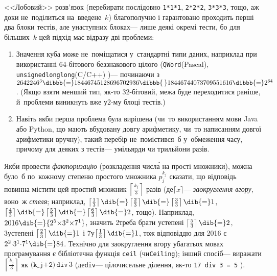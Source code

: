 \Tutorial
<<Лобовий>> розв'язок (перебирати послідовно \texttt{1*1*1}, \texttt{2*2*2}, \texttt{3*3*3}, тощо, аж доки не~поділиться на~введене~$k$) благополучно і гарантовано проходить перші два блоки тестів, але у\nolinebreak[3] наступних блоках\nolinebreak[3] --- лише деякі окремі тести, бо для більших~$k$ цей підхід має відразу дві проблеми: 
\begin{enumerate}
\item
Значення куба може не~поміщатися у~стандартні типи даних, наприклад при використанні \mbox{64-}\nolinebreak[3]бітового беззна\-ко\-вого цілого (\texttt{QWord}\nolinebreak[2] (Pascal), \texttt{unsigned\nolinebreak[2] long\nolinebreak[2] long}\nolinebreak[2] (C/C++)%
)\nolinebreak[3] --- починаючи з $2642246^3\dibbb{{=}}18446745128696702936\dibbb{{\>}}18446744073709551616\dibbb{{=}}2^{64}$.
(Якщо взяти менший тип, як-то \mbox{32-}\nolinebreak[3]бітовий, межа буде переходитися %
раніше, й~проблеми виникнуть вже у\nolinebreak[3] \mbox{2-му} блоці тестів.)
\item
Навіть якби перша проблема була вирішена (чи~то використанням мови Java або Python, що мають вбудовану довгу арифметику, чи~то написанням довгої арифметики вручну), такий перебір не~помістився~б у~обмеження часу, причому для деяких з тестів\nolinebreak[3] --- у\nolinebreak[3] мільярди чи трильйони разів.
\end{enumerate}


Якби провести \emph{факторизацію} (розкладення числ\'{а} на прості множники), можна було~б по~кожному степеню простого множника $p_j^{k_j}$ сказати, що відповідь повинна містити цей простий множник 
$\left\lceil\frac{k_j}{3}\right\rceil$ разів (де\nolinebreak[3] $\lceil{x}\rceil$\nolinebreak[3] --- \emph{заокруглення вгору}, воно~ж \emph{стеля}; наприклад, 
$\left\lceil\frac{1}{3}\right\rceil\dib{{=}}
 \left\lceil\frac{2}{3}\right\rceil\dib{{=}}
 \left\lceil\frac{3}{3}\right\rceil\dib{{=}}1$,
$\left\lceil\frac{4}{3}\right\rceil\dib{{=}}
 \left\lceil\frac{5}{3}\right\rceil\dib{{=}}
 \left\lceil\frac{6}{3}\right\rceil\dib{{=}}2$, тощо).
Наприклад, $2016\dib{{=}}{2^5{\times}3^2{\times}7^1}$, значить 
2\nolinebreak[3] треба брати у\nolinebreak[1] степені $\left\lceil\frac{5}{3}\right\rceil\dib{{=}}2$,
3\nolinebreak[3] у\nolinebreak[2] степені $\left\lceil\frac{2}{3}\right\rceil\dib{{=}}1$ і
7\nolinebreak[3] у\nolinebreak[2] $\left\lceil\frac{1}{3}\right\rceil\dib{{=}}1$,
тож відповіддю для 2016 є $2^2{\cdot}3^1{\cdot}7^1\dib{{=}}84$.
Технічно для заокруглення вгору у\nolinebreak[3] багатьох мовах програмування є бібліотечна функція \texttt{ceil} (чи\nolinebreak[3] \texttt{Ceiling}); інший спосіб\nolinebreak[3] --- виражати $\left\lceil\frac{k_j}{3}\right\rceil$ як ${{\texttt{(k\_j+2)}}\,{\texttt{div}}\,3}$ (де\nolinebreak[3] \texttt{div}\nolinebreak[3] --- цілочисельне ділення, як-то \texttt{17~div~3~=~5}%
).

